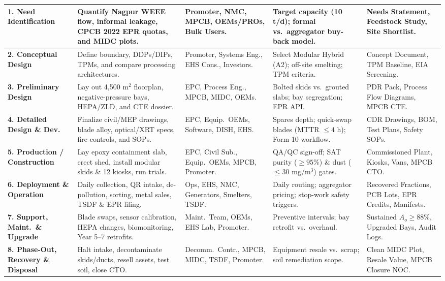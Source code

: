 \begin{xltabular}{\textwidth}{L{2.0cm} Y L{2.35cm} Y L{2.6cm}}
\textbf{1. Need Identification} & Quantify Nagpur WEEE flow, informal leakage, CPCB 2022 EPR quotas, and MIDC plots. & Promoter, NMC, MPCB, OEMs/PROs, Bulk Users. & Target capacity (10 t/d); formal vs.\ aggregator buy-back model. & Needs Statement, Feedstock Study, Site Shortlist. \\
\midrule
\textbf{2. Conceptual Design} & Define boundary, DDPs/DIPs, TPMs, and compare processing architectures. & Promoter, Systems Eng., EHS Cons., Investors. & Select Modular Hybrid (A2); off-site smelting; TPM criteria. & Concept Document, TPM Baseline, EIA Screening. \\
\midrule
\textbf{3. Preliminary Design} & Lay out 4,500 m$^2$ floorplan, negative-pressure bays, HEPA/ZLD, and CTE dossier. & EPC, Process Eng., MPCB, MIDC, OEMs. & Bolted skids vs.\ grouted slabs; bay segregation; EPR API. & PDR Pack, Process Flow Diagrams, MPCB CTE. \\
\midrule
\textbf{4. Detailed Design \& Dev.} & Finalize civil/MEP drawings, blade alloy, optical/XRT specs, fire controls, and SOPs. & EPC, Equip.\ OEMs, Software, DISH, EHS. & Spares depth; quick-swap blades (MTTR $\le 4$ h); Form-10 workflow. & CDR Drawings, BOM, Test Plans, Safety SOPs. \\
\midrule
\textbf{5. Production / Construction} & Lay epoxy containment slab, erect shed, install modular skids \& 12 kiosks, run trials. & EPC, Civil Sub., Equip.\ OEMs, MPCB, Promoter. & QA/QC sign-off; SAT purity ($\ge 95\%$) \& dust ($\le 30$ mg/m$^3$) gates. & Commissioned Plant, Kiosks, Vans, MPCB CTO. \\
\midrule
\textbf{6. Deployment \& Operation} & Daily collection, QR intake, de-pollution, sorting, metal sales, TSDF \& EPR filing. & Ops, EHS, NMC, Generators, Smelters, TSDF. & Daily routing; aggregator pricing; stop-work safety triggers. & Recovered Fractions, PCB Lots, EPR Credits, Manifests. \\
\midrule
\textbf{7. Support, Maint.\ \& Upgrade} & Blade swaps, sensor calibration, HEPA changes, biomonitoring, Year 5--7 retrofits. & Maint.\ Team, OEMs, EHS Lab, Promoter. & Preventive intervals; bay retrofit vs.\ overhaul. & Sustained $A_o \ge 88\%$, Upgraded Bays, Audit Logs. \\
\midrule
\textbf{8. Phase-Out, Recovery \& Disposal} & Halt intake, decontaminate skids/ducts, resell assets, test soil, close CTO. & Decomm.\ Contr., MPCB, MIDC, TSDF, Promoter. & Equipment resale vs.\ scrap; soil remediation scope. & Clean MIDC Plot, Resale Value, MPCB Closure NOC. \\

\end{xltabular}
\endgroup
